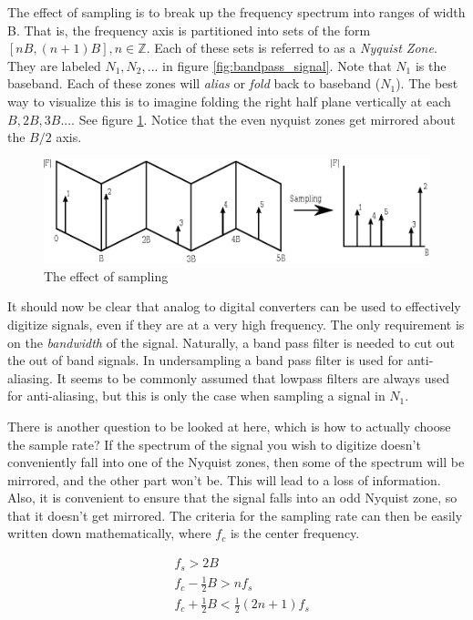 \documentclass[a4paper, 12pt, notitlepage]{article}
\begin{document}
The effect of sampling is to break up the frequency spectrum into ranges of width B.  That is, the frequency axis is partitioned into sets of the form $[nB, (n+1)B], n \in \mathbb{Z}$.  Each of these sets is referred to as a \textit{Nyquist Zone}.  They are labeled $N_1, N_2, ...$ in figure \ref{fig:bandpass_signal}.  Note that $N_1$ is the baseband.  Each of these zones will \textit{alias} or \textit{fold} back to baseband ($N_1$).  The best way to visualize this is to imagine folding the right half plane vertically at each $B, 2B, 3B ...$.  See figure \ref{fig:bandpass_sampling}.  Notice that the even nyquist zones get mirrored about the $B/2$ axis.

\begin{figure}[ht]
\caption{The effect of sampling}
\label{fig:bandpass_sampling}
\centering
\includegraphics[width=13cm]{images/bandpass_sampling.eps}
\end{figure}

It should now be clear that analog to digital converters can be used to effectively digitize signals, even if they are at a very high frequency.  The only requirement is on the \textit{bandwidth} of the signal.  Naturally, a band pass filter is needed to cut out the out of band signals.  In undersampling a band pass filter is used for anti-aliasing. It seems to be commonly assumed that lowpass filters are always used for anti-aliasing, but this is only the case when sampling a signal in $N_1$.

There is another question to be looked at here, which is how to actually choose the sample rate?  If the spectrum of the signal you wish to digitize doesn't conveniently fall into one of the Nyquist zones, then some of the spectrum will be mirrored, and the other part won't be.  This will lead to a loss of information.  Also, it is convenient to ensure that the signal falls into an odd Nyquist zone, so that it doesn't get mirrored.  The criteria for the sampling rate can then be easily written down mathematically, where $f_c$ is the center frequency.

\begin{equation}
\label{eq:sample_rate}
\begin{aligned}
  &f_s > 2B \\
  &f_c - \frac{1}{2}B > nf_s \\
  &f_c + \frac{1}{2}B < \frac{1}{2}(2n + 1)f_s \\
\end{aligned}
\end{equation}
\end{document}
